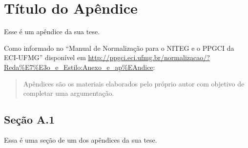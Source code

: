 \chapter{Título do Apêndice}
Esse é um apêndice da sua tese.

Como informado no ``Manual de Normalização para o NITEG e o PPGCI da ECI-UFMG''
disponível em
\url{http://ppgci.eci.ufmg.br/normalizacao/?Reda%E7%E3o_e_Estilo:Anexo_e_ap%EAndice}:
\begin{quote}
  Apêndices são os materiais elaborados pelo próprio autor com objetivo de
  completar uma argumentação. 
\end{quote}

\section{Seção A.1}
Essa é uma seção de um dos apêndices da sua tese.
